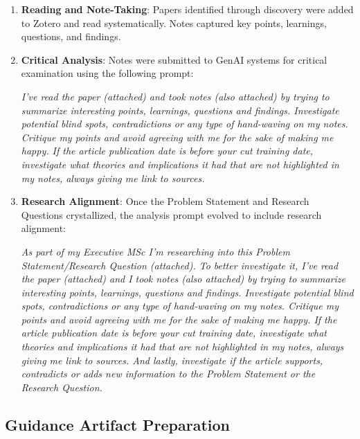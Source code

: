 \begin{enumerate}
    \item \textbf{Reading and Note-Taking}: Papers identified through discovery were added to
          Zotero and read systematically. Notes captured key points, learnings, questions,
          and findings.
    \item \textbf{Critical Analysis}: Notes were submitted to GenAI systems for critical
          examination using the following prompt:

          \textit{I've read the paper (attached) and took notes (also attached) by trying to summarize
              interesting points, learnings, questions and findings. Investigate potential blind spots,
              contradictions or any type of hand-waving on my notes. Critique my points and avoid
              agreeing with me for the sake of making me happy. If the article publication date is before
              your cut training date, investigate what theories and implications it had that are not
              highlighted in my notes, always giving me link to sources.}

    \item \textbf{Research Alignment}: Once the Problem Statement and Research Questions
          crystallized, the analysis prompt evolved to include research alignment:

          \textit{As part of my Executive MSc I'm researching into this Problem Statement/Research
              Question (attached). To better investigate it, I've read the paper (attached) and I
              took notes (also attached) by trying to summarize interesting points, learnings, questions
              and findings. Investigate potential blind spots, contradictions or any type of hand-waving
              on my notes. Critique my points and avoid agreeing with me for the sake of making me happy.
              If the article publication date is before your cut training date, investigate what theories
              and implications it had that are not highlighted in my notes, always giving me link to sources.
              And lastly, investigate if the article supports, contradicts or adds new information to
              the Problem Statement or the Research Question.}

\end{enumerate}

\subsection{Guidance Artifact Preparation}

